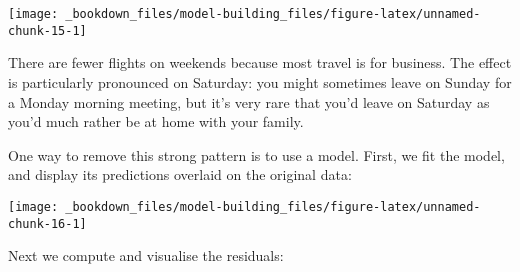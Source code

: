\documentclass[]{book}
\newenvironment{Shaded}{\begin{snugshade}}{\end{snugshade}}
\newcommand{\KeywordTok}[1]{\textcolor[rgb]{0.13,0.29,0.53}{\textbf{{#1}}}}
\newcommand{\DataTypeTok}[1]{\textcolor[rgb]{0.13,0.29,0.53}{{#1}}}
\newcommand{\DecValTok}[1]{\textcolor[rgb]{0.00,0.00,0.81}{{#1}}}
\newcommand{\StringTok}[1]{\textcolor[rgb]{0.31,0.60,0.02}{{#1}}}
\newcommand{\NormalTok}[1]{{#1}}
\begin{document}
\begin{center}\texttt{[image: \_bookdown\_files/model-building\_files/figure-latex/unnamed-chunk-15-1]} \end{center}

There are fewer flights on weekends because most travel is for business.
The effect is particularly pronounced on Saturday: you might sometimes
leave on Sunday for a Monday morning meeting, but it's very rare that
you'd leave on Saturday as you'd much rather be at home with your
family.

One way to remove this strong pattern is to use a model. First, we fit
the model, and display its predictions overlaid on the original data:

\begin{Shaded}
\end{Shaded}

\begin{center}\texttt{[image: \_bookdown\_files/model-building\_files/figure-latex/unnamed-chunk-16-1]} \end{center}

Next we compute and visualise the residuals:

\begin{Shaded}
\end{Shaded}
\end{document}
